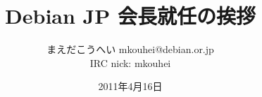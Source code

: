 




\documentclass[cjk,dvipdfmx,12pt]{beamer}
\usepackage{monthlypresentation}



\title{Debian JP 会長就任の挨拶}
\author{まえだこうへい mkouhei@debian.or.jp\\IRC nick: mkouhei}
\date{2011年4月16日}



